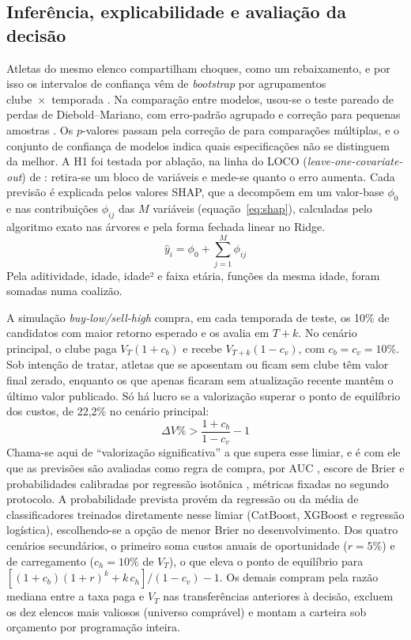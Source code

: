 \documentclass[article, 12pt, oneside, a4paper, english, brazil, section=TITLE]{abntex2}
\begin{document}
\subsection{Inferência, explicabilidade e avaliação da decisão}

Atletas do mesmo elenco compartilham choques, como um rebaixamento, e por isso os intervalos de confiança vêm de \textit{bootstrap} por agrupamentos clube~×~temporada \cite{cameron2008}.
Na comparação entre modelos, usou-se o teste pareado de perdas de Diebold–Mariano, com erro-padrão agrupado e correção para pequenas amostras \cite{diebold1995,harvey1997}.
Os $p$-valores passam pela correção de \textcite{holm1979} para comparações múltiplas, e o conjunto de confiança de modelos \cite{hansen2011} indica quais especificações não se distinguem da melhor.
A H1 foi testada por ablação, na linha do LOCO (\textit{leave-one-covariate-out}) de \textcite{lei2018}: retira-se um bloco de variáveis e mede-se quanto o erro aumenta.
Cada previsão é explicada pelos valores SHAP, que a decompõem em um valor-base $\phi_0$ e nas contribuições $\phi_{ij}$ das $M$ variáveis (equação~\eqref{eq:shap}), calculadas pelo algoritmo exato nas árvores e pela forma fechada linear no Ridge.
\begin{equation}
  \hat{y}_i = \phi_0 + \sum_{j=1}^{M} \phi_{ij}
  \label{eq:shap}
\end{equation}
Pela aditividade, idade, idade² e faixa etária, funções da mesma idade, foram somadas numa coalizão.

A simulação \textit{buy-low/sell-high} compra, em cada temporada de teste, os 10\% de candidatos com maior retorno esperado e os avalia em $T+k$.
No cenário principal, o clube paga $V_T(1 + c_b)$ e recebe $V_{T+k}(1 - c_v)$, com $c_b = c_v = 10\%$.
Sob intenção de tratar, atletas que se aposentam ou ficam sem clube têm valor final zerado, enquanto os que apenas ficaram sem atualização recente mantêm o último valor publicado.
Só há lucro se a valorização superar o ponto de equilíbrio dos custos, de 22,2\% no cenário principal:
\begin{equation}
  \Delta V\% > \frac{1 + c_b}{1 - c_v} - 1
  \label{eq:breakeven}
\end{equation}
Chama-se aqui de \enquote{valorização significativa} a que supera esse limiar, e é com ele que as previsões são avaliadas como regra de compra, por AUC \cite{fawcett2006}, escore de Brier \cite{brier1950} e probabilidades calibradas por regressão isotônica \cite{zadrozny2002}, métricas fixadas no segundo protocolo.
A probabilidade prevista provém da regressão ou da média de classificadores treinados diretamente nesse limiar (CatBoost, XGBoost e regressão logística), escolhendo-se a opção de menor Brier no desenvolvimento.
Dos quatro cenários secundários, o primeiro soma custos anuais de oportunidade ($r = 5\%$) e de carregamento ($c_h = 10\%$ de $V_T$), o que eleva o ponto de equilíbrio para $[(1 + c_b)(1 + r)^k + k\,c_h]/(1 - c_v) - 1$.
Os demais compram pela razão mediana entre a taxa paga e $V_T$ nas transferências anteriores à decisão, excluem os dez elencos mais valiosos (universo comprável) e montam a carteira sob orçamento por programação inteira.
\end{document}
